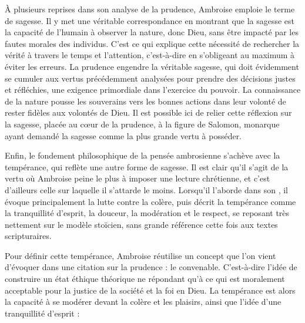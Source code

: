 \bigskip

À plusieurs reprises dans son analyse de la prudence, Ambroise emploie le terme de sagesse. Il y met une véritable correspondance en montrant que la sagesse est la capacité de l'humain à observer la nature, donc Dieu, sans être impacté par les fautes morales des individus. C'est ce qui explique cette nécessité de rechercher la vérité à travers le temps et l'attention, c'est-à-dire en s'obligeant au maximum à éviter les erreurs. La prudence engendre la véritable sagesse, qui doit évidemment se cumuler aux vertus précédemment analysées pour prendre des décisions justes et réfléchies, une exigence primordiale dans l'exercice du pouvoir. La connaissance de la nature pousse les souverains vers les bonnes actions dans leur volonté de rester fidèles aux volontés de Dieu. Il est possible ici de relier cette réflexion sur la sagesse, placée au cœur de la prudence, à la figure de Salomon, monarque ayant demandé la sagesse comme la plus grande vertu à posséder.

\bigskip

Enfin, le fondement philosophique de la pensée ambrosienne s'achève avec la tempérance, qui reflète une autre forme de sagesse. Il est clair qu'il s'agit de la vertu où Ambroise peine le plus à imposer une lecture chrétienne, et c'est d'ailleurs celle sur laquelle il s'attarde le moins. Lorsqu'il l'aborde dans son \autocite[\nopp I, 210-219]{ambroise_devoirs_1}, il évoque principalement la lutte contre la colère, puis décrit la tempérance comme la tranquillité d'esprit, la douceur, la modération et le respect, se reposant très nettement sur le modèle stoïcien, sans grande référence cette fois aux textes scripturaires.

\bigskip

Pour définir cette tempérance, Ambroise réutilise un concept que l'on vient d'évoquer dans une citation sur la prudence : le convenable. C'est-à-dire l'idée de construire un état éthique théorique ne répondant qu'à ce qui est moralement acceptable pour la justice de la société et la foi en Dieu. La tempérance est alors la capacité à se modérer devant la colère et les plaisirs, ainsi que l’idée d’une tranquillité d’esprit :

\bigskip

